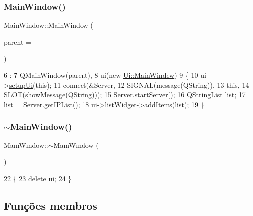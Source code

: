 \subsubsection{\texorpdfstring{Main\+Window()}{MainWindow()}}
{\footnotesize\ttfamily Main\+Window\+::\+Main\+Window (\begin{DoxyParamCaption}\item[{Q\+Widget $\ast$}]{parent = {} }\end{DoxyParamCaption})\hspace{0.3cm}{\ttfamily [explicit]}}


\begin{DoxyCode}
6                                       :
7   QMainWindow(parent),
8   ui(\textcolor{keyword}{new} \mbox{\hyperlink{class_ui_1_1_main_window}{Ui::MainWindow}})
9 \{
10   ui->\mbox{\hyperlink{class_ui___main_window_acf4a0872c4c77d8f43a2ec66ed849b58}{setupUi}}(\textcolor{keyword}{this});
11   connect(&Server,
12           SIGNAL(message(QString)),
13           \textcolor{keyword}{this},
14           SLOT(\mbox{\hyperlink{class_main_window_a0edca0c59fb238bea02b248c90b89698}{showMessage}}(QString)));
15   Server.\mbox{\hyperlink{class_my_server_a962f0e205a0aaf08b12d50d1315a8c90}{startServer}}();
16   QStringList list;
17   list = Server.\mbox{\hyperlink{class_my_server_ac10d498dcc2b5d691f131f17b6602a59}{getIPList}}();
18   ui->\mbox{\hyperlink{class_ui___main_window_ae647a15635ba8a0e5d5aec475db99d8f}{listWidget}}->addItems(list);
19 \}
\end{DoxyCode}
\mbox{\label{class_main_window_ae98d00a93bc118200eeef9f9bba1dba7}} 
\subsubsection{\texorpdfstring{$\sim$\+Main\+Window()}{~MainWindow()}}
{\footnotesize\ttfamily Main\+Window\+::$\sim$\+Main\+Window (\begin{DoxyParamCaption}{ }\end{DoxyParamCaption})}


\begin{DoxyCode}
22 \{
23   \textcolor{keyword}{delete} ui;
24 \}
\end{DoxyCode}


\subsection{Funções membros}
\mbox{\label{class_main_window_a0edca0c59fb238bea02b248c90b89698}} 
